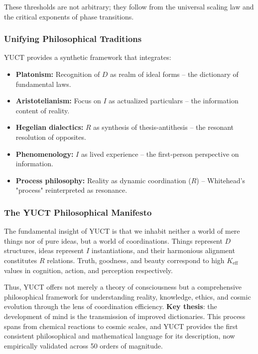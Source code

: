 \documentclass[12pt,a4paper]{article}
\newcommand{\eff}{\mathrm{eff}}
\newcommand{\Ke}{K_{\eff}}
\begin{document}
	These thresholds are not arbitrary; they follow from the universal scaling law and the critical exponents of phase transitions.
	
	\subsubsection{Unifying Philosophical Traditions}
	
	YUCT provides a synthetic framework that integrates:
	\begin{itemize}
		\item \textbf{Platonism:} Recognition of $D$ as realm of ideal forms – the dictionary of fundamental laws.
		\item \textbf{Aristotelianism:} Focus on $I$ as actualized particulars – the information content of reality.
		\item \textbf{Hegelian dialectics:} $R$ as synthesis of thesis-antithesis – the resonant resolution of opposites.
		\item \textbf{Phenomenology:} $I$ as lived experience – the first‑person perspective on information.
		\item \textbf{Process philosophy:} Reality as dynamic coordination ($R$) – Whitehead's "process" reinterpreted as resonance.
	\end{itemize}
	
	\subsubsection{The YUCT Philosophical Manifesto}
	
	The fundamental insight of YUCT is that we inhabit neither a world of mere things nor of pure ideas, but a world of coordinations. Things represent $D$ structures, ideas represent $I$ instantiations, and their harmonious alignment constitutes $R$ relations. Truth, goodness, and beauty correspond to high $\Ke$ values in cognition, action, and perception respectively.
	
	Thus, YUCT offers not merely a theory of consciousness but a comprehensive philosophical framework for understanding reality, knowledge, ethics, and cosmic evolution through the lens of coordination efficiency.
	\textbf{Key thesis}: the development of mind is the transmission of improved dictionaries. This process spans from chemical reactions to cosmic scales, and YUCT provides the first consistent philosophical and mathematical language for its description, now empirically validated across 50 orders of magnitude.
	
\end{document}

